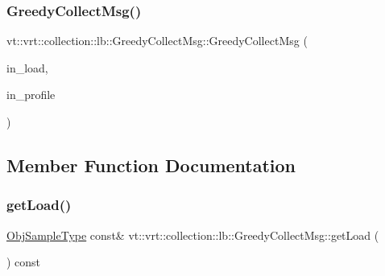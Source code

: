 \subsubsection{\texorpdfstring{Greedy\+Collect\+Msg()}{GreedyCollectMsg()}\hspace{0.1cm}{\footnotesize\ttfamily [2/2]}}
{\footnotesize\ttfamily vt\+::vrt\+::collection\+::lb\+::\+Greedy\+Collect\+Msg\+::\+Greedy\+Collect\+Msg (\begin{DoxyParamCaption}\item[{\hyperlink{structvt_1_1vrt_1_1collection_1_1lb_1_1_greedy_l_b_types_a467f8a79d0785fca5fc95bd5c0f406b9}{Obj\+Sample\+Type} const \&}]{in\+\_\+load,  }\item[{\hyperlink{structvt_1_1vrt_1_1collection_1_1lb_1_1_greedy_l_b_types_a9fe8829bc0c92e88ddf9d149233a54f4}{Load\+Type} const \&}]{in\+\_\+profile }\end{DoxyParamCaption})\hspace{0.3cm}{\ttfamily [inline]}}



\subsection{Member Function Documentation}
\mbox{\label{structvt_1_1vrt_1_1collection_1_1lb_1_1_greedy_collect_msg_a6455aa0e3d5468d08a801c679b2d2d80}} 
\subsubsection{\texorpdfstring{get\+Load()}{getLoad()}}
{\footnotesize\ttfamily \hyperlink{structvt_1_1vrt_1_1collection_1_1lb_1_1_greedy_l_b_types_a467f8a79d0785fca5fc95bd5c0f406b9}{Obj\+Sample\+Type} const\& vt\+::vrt\+::collection\+::lb\+::\+Greedy\+Collect\+Msg\+::get\+Load (\begin{DoxyParamCaption}{ }\end{DoxyParamCaption}) const\hspace{0.3cm}{\ttfamily [inline]}}

\mbox{\label{structvt_1_1vrt_1_1collection_1_1lb_1_1_greedy_collect_msg_a83ba5b561927582a06451672f95999a4}} 
